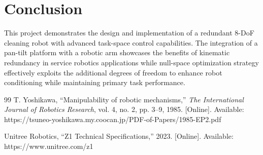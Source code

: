 \documentclass[journal,10pt,twocolumn]{IEEEtran}
\begin{document}
\section{Conclusion}

This project demonstrates the design and implementation of a redundant 8-DoF cleaning robot with advanced task-space control capabilities. 
The integration of a pan-tilt platform with a robotic arm showcases the benefits of kinematic redundancy in service robotics applications while null-space optimization strategy effectively exploits the additional degrees of freedom to enhance robot conditioning while maintaining primary task performance.

\begin{thebibliography}{99}
T. Yoshikawa, ``Manipulability of robotic mechanisms,'' \emph{The International Journal of Robotics Research}, vol. 4, no. 2, pp. 3--9, 1985. [Online]. Available: https://tsuneo-yoshikawa.my.coocan.jp/PDF-of-Papers/1985-EP2.pdf

Unitree Robotics, ``Z1 Technical Specifications,'' 2023. [Online]. Available: https://www.unitree.com/z1
\end{thebibliography}
\end{document}
